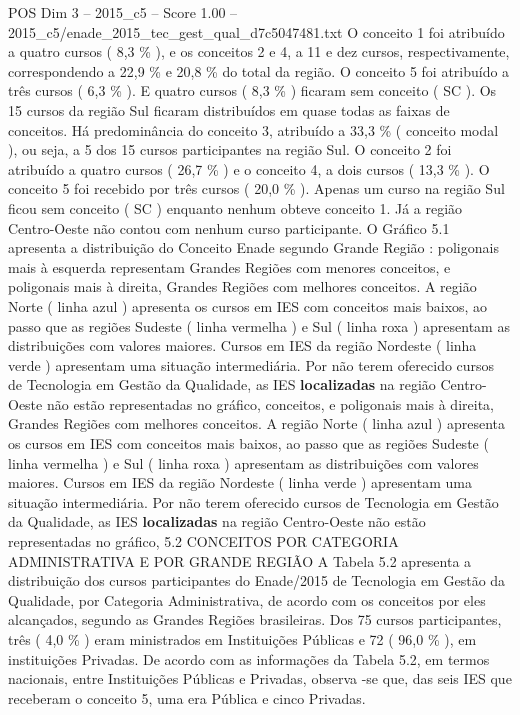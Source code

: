 \begin{textsample}{POS Dim 3 – 2015\_c5 – Score 1.00 – 2015\_c5/enade\_2015\_tec\_gest\_qual\_d7c5047481.txt}
O conceito 1 foi atribuído a quatro cursos ( 8,3 \% ), e os conceitos 2 e 4, a 11 e dez cursos, respectivamente, correspondendo a 22,9 \% e 20,8 \% do total da região.
O conceito 5 foi atribuído a três cursos ( 6,3 \% ).
E quatro cursos ( 8,3 \% ) ficaram sem conceito ( SC ).
Os 15 cursos da região Sul ficaram distribuídos em quase todas as faixas de conceitos.
Há predominância do conceito 3, atribuído a 33,3 \% ( conceito modal ), ou seja, a 5 dos 15 cursos participantes na região Sul.
O conceito 2 foi atribuído a quatro cursos ( 26,7 \% ) e o conceito 4, a dois cursos ( 13,3 \% ).
O conceito 5 foi recebido por três cursos ( 20,0 \% ).
Apenas um curso na região Sul ficou sem conceito ( SC ) enquanto nenhum obteve conceito 1.
Já a região Centro-Oeste não contou com nenhum curso participante.
O Gráfico 5.1 apresenta a distribuição do Conceito Enade segundo Grande Região : poligonais mais à esquerda representam Grandes Regiões com menores conceitos, e poligonais mais à direita, Grandes Regiões com melhores conceitos.
A região Norte ( linha azul ) apresenta os cursos em IES com conceitos mais baixos, ao passo que as regiões Sudeste ( linha vermelha ) e Sul ( linha roxa ) apresentam as distribuições com valores maiores.
Cursos em IES da região Nordeste ( linha verde ) apresentam uma situação intermediária.
Por não terem oferecido cursos de Tecnologia em Gestão da Qualidade, as IES \textbf{localizadas} na região Centro-Oeste não estão representadas no gráfico, conceitos, e poligonais mais à direita, Grandes Regiões com melhores conceitos.
A região Norte ( linha azul ) apresenta os cursos em IES com conceitos mais baixos, ao passo que as regiões Sudeste ( linha vermelha ) e Sul ( linha roxa ) apresentam as distribuições com valores maiores.
Cursos em IES da região Nordeste ( linha verde ) apresentam uma situação intermediária.
Por não terem oferecido cursos de Tecnologia em Gestão da Qualidade, as IES \textbf{localizadas} na região Centro-Oeste não estão representadas no gráfico, 5.2 CONCEITOS POR CATEGORIA ADMINISTRATIVA E POR GRANDE REGIÃO A Tabela 5.2 apresenta a distribuição dos cursos participantes do Enade/2015 de Tecnologia em Gestão da Qualidade, por Categoria Administrativa, de acordo com os conceitos por eles alcançados, segundo as Grandes Regiões brasileiras.
Dos 75 cursos participantes, três ( 4,0 \% ) eram ministrados em Instituições Públicas e 72 ( 96,0 \% ), em instituições Privadas.
De acordo com as informações da Tabela 5.2, em termos nacionais, entre Instituições Públicas e Privadas, observa -se que, das seis IES que receberam o conceito 5, uma era Pública e cinco Privadas.

\end{textsample}
